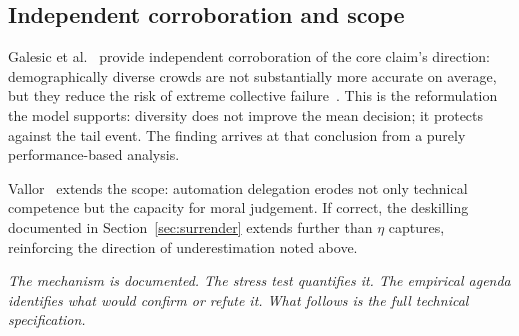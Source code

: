 \documentclass[11pt,a4paper]{article}
\newcommand{\bridgeskip}{\vspace{6pt}}
\begin{document}
\subsection{Independent corroboration and scope}

Galesic et al.~\cite{galesic_pnas_2018} provide independent corroboration
of the core claim's direction: demographically diverse crowds are not
substantially more accurate on average, but they reduce the risk of extreme
collective failure~\cite{deoliveira_pnas_2018}. This is the reformulation the model supports: diversity
does not improve the mean decision; it protects against the tail event. The
finding arrives at that conclusion from a purely performance-based analysis.

Vallor~\cite{vallor_philtech_2015} extends the scope: automation delegation
erodes not only technical competence but the capacity for moral judgement.
If correct, the deskilling documented in Section~\ref{sec:surrender}
extends further than $\eta$ captures, reinforcing the direction of
underestimation noted above.

\bridgeskip
\noindent\textit{The mechanism is documented. The stress test quantifies it.
The empirical agenda identifies what would confirm or refute it. What
follows is the full technical specification.}
\end{document}
